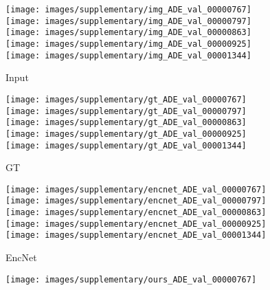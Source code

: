 \documentclass[10pt,twocolumn,letterpaper]{article}
\begin{document}
\begin{figure*}[!htb] 
\begin{center}
	\begin{subfigure}[b]{0.24\linewidth}
		\texttt{[image: images/supplementary/img\_ADE\_val\_00000767]}\\
		\texttt{[image: images/supplementary/img\_ADE\_val\_00000797]}\\
		\texttt{[image: images/supplementary/img\_ADE\_val\_00000863]}\\
		\texttt{[image: images/supplementary/img\_ADE\_val\_00000925]}\\
		\texttt{[image: images/supplementary/img\_ADE\_val\_00001344]}\\
		\caption{Input}
    \end{subfigure}
    \hfill
    \begin{subfigure}[b]{0.24\linewidth}
		\texttt{[image: images/supplementary/gt\_ADE\_val\_00000767]}\\
		\texttt{[image: images/supplementary/gt\_ADE\_val\_00000797]}\\
		\texttt{[image: images/supplementary/gt\_ADE\_val\_00000863]}\\
		\texttt{[image: images/supplementary/gt\_ADE\_val\_00000925]}\\
		\texttt{[image: images/supplementary/gt\_ADE\_val\_00001344]}\\
		\caption{GT}
    \end{subfigure}
    \hfill
    \begin{subfigure}[b]{0.24\linewidth}
		\texttt{[image: images/supplementary/encnet\_ADE\_val\_00000767]}\\
		\texttt{[image: images/supplementary/encnet\_ADE\_val\_00000797]}\\
		\texttt{[image: images/supplementary/encnet\_ADE\_val\_00000863]}\\
		\texttt{[image: images/supplementary/encnet\_ADE\_val\_00000925]}\\
		\texttt{[image: images/supplementary/encnet\_ADE\_val\_00001344]}\\
		\caption{EncNet}
    \end{subfigure}
    \hfill
    \begin{subfigure}[b]{0.24\linewidth}
		\texttt{[image: images/supplementary/ours\_ADE\_val\_00000767]}\\

\end{subfigure}
\end{center}
\end{figure*}
\end{document}

